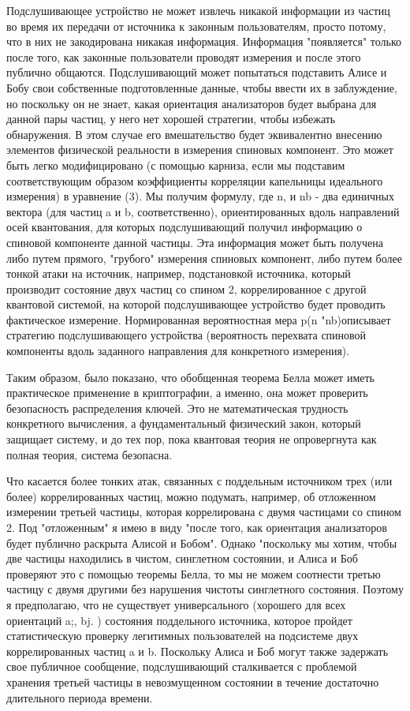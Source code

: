 Подслушивающее устройство не может извлечь никакой информации из частиц во время их передачи от источника к законным пользователям, просто потому, что в них не закодирована никакая информация. Информация "появляется" только после того, как законные пользователи проводят измерения и после этого публично общаются. Подслушивающий может попытаться подставить Алисе и Бобу свои собственные подготовленные данные, чтобы ввести их в заблуждение, но поскольку он не знает, какая ориентация анализаторов будет выбрана для данной пары частиц, у него нет хорошей стратегии, чтобы избежать обнаружения. В этом случае его вмешательство будет эквивалентно внесению элементов физической реальности в измерения спиновых компонент. Это может быть легко модифицировано (с помощью карниза, если мы подставим соответствующим образом коэффициенты корреляции капельницы идеального измерения) в уравнение (3). Мы получим формулу, где n, и nb - два единичных вектора (для частиц a и b, соответственно), ориентированных вдоль направлений осей квантования, для которых подслушивающий получил информацию о спиновой компоненте данной частицы. Эта информация может быть получена либо путем прямого, "грубого" измерения спиновых компонент, либо путем более тонкой атаки на источник, например, подстановкой источника, который производит состояние двух частиц со спином 2, коррелированное с другой квантовой системой, на которой подслушивающее устройство будет проводить фактическое измерение. Нормированная вероятностная мера p(n "nb)описывает стратегию подслушивающего устройства (вероятность перехвата спиновой компоненты вдоль заданного направления для конкретного измерения).

Таким образом, было показано, что обобщенная теорема Белла может иметь практическое применение в криптографии, а именно, она может проверить безопасность распределения ключей. Это не математическая трудность конкретного вычисления, а фундаментальный физический закон, который защищает систему, и до тех пор, пока квантовая теория не опровергнута как полная теория, система безопасна.

Что касается более тонких атак, связанных с поддельным источником трех (или более) коррелированных частиц, можно подумать, например, об отложенном измерении третьей частицы, которая коррелирована с двумя частицами со спином 2. Под "отложенным" я имею в виду "после того, как ориентация анализаторов будет публично раскрыта Алисой и Бобом". Однако "поскольку мы хотим, чтобы две частицы находились в чистом, синглетном состоянии, и Алиса и Боб проверяют это с помощью теоремы Белла, то мы не можем соотнести третью частицу с двумя другими без нарушения чистоты синглетного состояния. Поэтому я предполагаю, что не существует универсального (хорошего для всех ориентаций a;, bj. ) состояния поддельного источника, которое пройдет статистическую проверку легитимных пользователей на подсистеме двух коррелированных частиц a и b. Поскольку Алиса и Боб могут также задержать свое публичное сообщение, подслушивающий сталкивается с проблемой хранения третьей частицы в невозмущенном состоянии в течение достаточно длительного периода времени.

